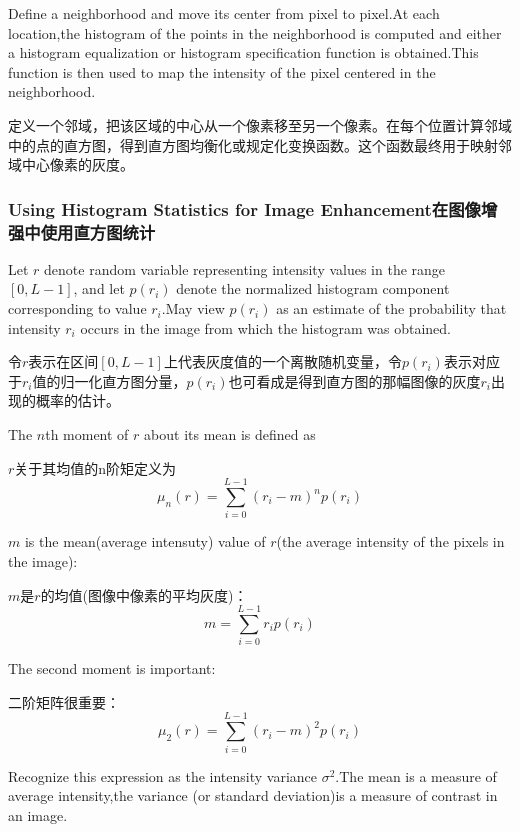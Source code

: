 \documentclass[12pt]{article}
\numberwithin{equation}{section}%
\begin{document}
Define a neighborhood and move its center from pixel to pixel.At each location,the histogram of the points in the neighborhood is computed and either a histogram equalization or histogram specification function is obtained.This function is then used to map the intensity of the pixel centered in the neighborhood.

定义一个邻域，把该区域的中心从一个像素移至另一个像素。在每个位置计算邻域中的点的直方图，得到直方图均衡化或规定化变换函数。这个函数最终用于映射邻域中心像素的灰度。
\subsubsection{Using Histogram Statistics for Image Enhancement在图像增强中使用直方图统计}

Let $r$ denote random variable representing intensity values in the range $[0,L-1]$, and let $p(r_{i})$ denote the normalized histogram component corresponding to value $r_{i}$.May view  $p(r_{i})$ as an estimate of the probability that intensity $r_{i}$ occurs in the image from which the histogram was obtained.

令$r$表示在区间$[0,L-1]$上代表灰度值的一个离散随机变量，令$p(r_{i})$表示对应于$r_{i}$值的归一化直方图分量，$p(r_{i})$也可看成是得到直方图的那幅图像的灰度$r_{i}$出现的概率的估计。

The $n$th moment of $r$ about its mean is defined as 

$r$关于其均值的n阶矩定义为
\begin{equation} \label {3.17}
\mu_{n}(r)=\sum_{i=0}^{L-1}(r_{i}-m)^{n}p(r_{i})
\end{equation}

$m$ is the mean(average intensuty) value of $r$(the average intensity of the pixels in the image):

$m$是$r$的均值(图像中像素的平均灰度)：
\begin{equation} \label {3.18}
m=\sum_{i=0}^{L-1}r_{i}p(r_{i})
\end{equation}

The second moment is important:

二阶矩阵很重要：
\begin{equation} \label {3.19}
\mu_{2}(r)=\sum_{i=0}^{L-1}(r_{i}-m)^{2}p(r_{i})
\end{equation}

Recognize this expression as the intensity variance $\sigma^{2}$.The mean is a measure of average intensity,the variance (or standard deviation)is a measure of contrast in an image.
\end{document}

